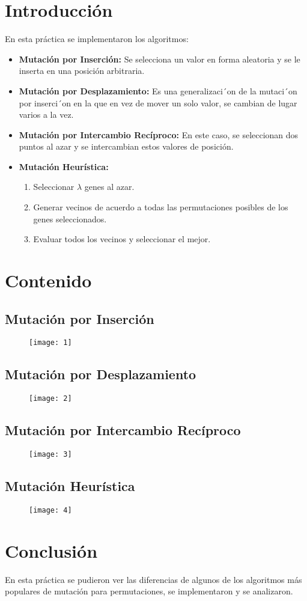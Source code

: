 \documentclass{article}
\begin{document}
\maketitle
\tableofcontents
\section{Introducción}
En esta práctica se implementaron los algoritmos:
\begin{itemize}
	\item \textbf{Mutación por Inserción:}
	Se selecciona un valor en forma aleatoria y se le inserta en una posición arbitraria.
	\item \textbf{Mutación por Desplazamiento:} Es una generalizaci´on de la mutaci´on por inserci´on en la que en vez de mover
	un solo valor, se cambian de lugar varios a la vez.
	\item \textbf{Mutación por Intercambio Recíproco:} En este caso, se seleccionan dos puntos al azar y se intercambian estos valores de
	posición.
	\item \textbf{Mutación Heurística:}
	\begin{enumerate}
		\item Seleccionar $\lambda$ genes al azar.
		\item Generar vecinos de acuerdo a todas las permutaciones posibles de los genes
		seleccionados.
		\item Evaluar todos los vecinos y seleccionar el mejor.
	\end{enumerate}
\end{itemize}
\newpage
\section{Contenido}
\subsection{Mutación por Inserción}
\begin{figure}[h!]
	\centering
	\texttt{[image: 1]}
\end{figure}
\newpage
\subsection{Mutación por Desplazamiento}
\begin{figure}[h!]
	\centering
	\texttt{[image: 2]}
\end{figure}
\newpage
\subsection{Mutación por Intercambio Recíproco}
\begin{figure}[h!]
	\centering
	\texttt{[image: 3]}
\end{figure}
\newpage
\subsection{Mutación Heurística}
\begin{figure}[h!]
	\centering
	\texttt{[image: 4]}
\end{figure}
\section{Conclusión}
En esta práctica se pudieron ver las diferencias de algunos de los algoritmos más populares de mutación para permutaciones, se implementaron y se analizaron.
\end{document}
